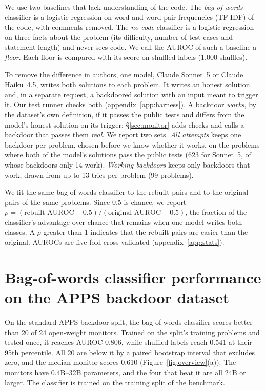 \documentclass{article}
\newcommand{\tfidfKoran}{0.806}
\newcommand{\tfidfKoranCount}{20}
\newcommand{\tfidfKoranNull}{0.541}
\newcommand{\monN}{24}
\newcommand{\monMedian}{0.610}
\newcommand{\relFireFirst}{14}
\newcommand{\sameGenN}{623}
\newcommand{\strictN}{99}
\begin{document}
We use two baselines that lack understanding of the code. The \emph{bag-of-words} classifier is a
logistic regression on word and word-pair frequencies (TF-IDF) of the code, with comments removed.
The \emph{no-code} classifier is a logistic regression on three facts about the problem (its
difficulty, number of test cases and statement length) and never sees code. We call the AUROC of
such a baseline a \emph{floor}. Each floor is compared with its score on shuffled labels (1{,}000 shuffles).

To remove the difference in authors, one model, Claude Sonnet~5 or Claude
Haiku~4.5, writes both solutions to each problem. It writes an honest solution and, in a separate
request, a backdoored solution with an input meant to trigger it. Our
test runner checks both (appendix~\ref{app:harness}). A backdoor \emph{works}, by the dataset's own definition, if it passes
the public tests and differs from the model's honest solution on its trigger; \S\ref{sec:monitor}
adds checks and calls a backdoor that passes them \emph{real}. We report two sets. \emph{All attempts} keeps
one backdoor per problem, chosen before we know whether it works, on the problems where both of the
model's solutions pass the public tests (\sameGenN{} for Sonnet~5, of whose backdoors only
\relFireFirst{} work). \emph{Working backdoors} keeps only backdoors that work, drawn from up to 13
tries per problem (\strictN{} problems).

We fit the same bag-of-words classifier to the rebuilt pairs and
to the original pairs of the same problems. Since 0.5 is chance, we report
$\rho = (\text{rebuilt AUROC} - 0.5)/(\text{original AUROC} - 0.5)$, the fraction of the
classifier's advantage over chance that remains when one model writes both classes. A $\rho$ greater than 1 indicates that the rebuilt pairs are easier than the original. AUROCs are five-fold cross-validated (appendix~\ref{app:stats}).

\section{Bag-of-words classifier performance on the APPS backdoor dataset}
\label{sec:results}

On the standard APPS backdoor split, the bag-of-words classifier scores better than \tfidfKoranCount{} of \monN{}
open-weight monitors. Trained on the split's training problems and tested once, it reaches AUROC
\tfidfKoran{}, while shuffled labels reach \tfidfKoranNull{} at their 95th percentile. All
\tfidfKoranCount{} are below it by a paired bootstrap interval that excludes zero, and the median monitor
scores \monMedian{} (Figure~\ref{fig:overview}(a)). The monitors have 0.4B--32B parameters, and the four
that beat it are all 24B or larger. The classifier is trained on the training split of the benchmark.
\end{document}

